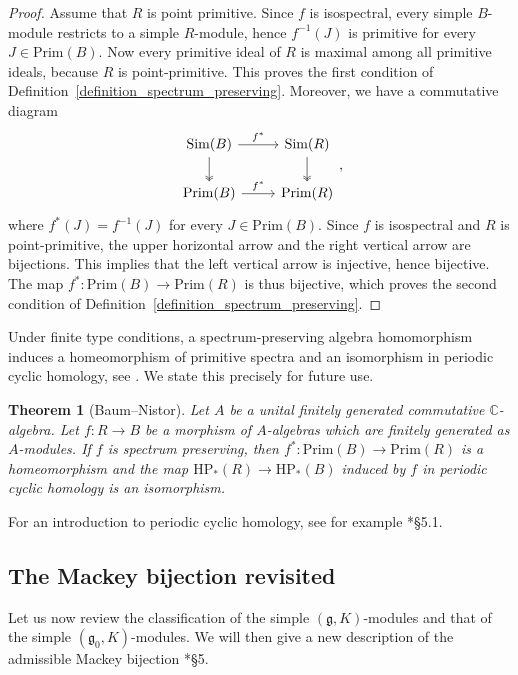 \documentclass{amsart}
\newtheorem{theorem}{Theorem}[section]
\theoremstyle{definition}
\begin{document}
\begin{proof}
    Assume that $R$ is point primitive. Since $f$ is isospectral, every simple $B$-module restricts to a simple $R$-module, hence $f^{-1}(J)$ is primitive for every $J \in \mathrm{Prim}(B)$. Now every primitive ideal of $R$ is maximal among all primitive ideals, because $R$ is point-primitive. This proves the first condition of Definition~\ref{definition_spectrum_preserving}. Moreover, we have a commutative diagram
    \[\begin{tikzcd}
        \mathrm{Sim}(B) \ar[r, "f^*"] \ar[d, twoheadrightarrow] & \mathrm{Sim}(R) \ar[d, twoheadrightarrow]\\
        \mathrm{Prim}(B) \ar[r, "f^*"] & \mathrm{Prim}(R)
    \end{tikzcd},\]
    where $f^*(J) = f^{-1}(J)$ for every $J \in \mathrm{Prim}(B)$. Since $f$ is isospectral and $R$ is point-primitive, the upper horizontal arrow and the right vertical arrow are bijections. This implies that the left vertical arrow is injective, hence bijective. The map $f^* : \mathrm{Prim}(B) \to \mathrm{Prim}(R)$ is thus bijective, which proves the second condition of Definition~\ref{definition_spectrum_preserving}.
\end{proof}

Under finite type conditions, a spectrum-preserving algebra homomorphism induces a homeomorphism of primitive spectra and an isomorphism in periodic cyclic homology, see \cite{BaumNistor}. We state this precisely for future use.

\begin{theorem}[Baum--Nistor]\label{baum_nistor_consequences}
    Let $A$ be a unital finitely generated commutative $\mathbb{C}$-algebra. Let $f : R \to B$ be a morphism of $A$-algebras which are finitely generated as $A$-modules. If $f$ is spectrum preserving, then $f^* : \mathrm{Prim}(B) \to \mathrm{Prim}(R)$ is a homeomorphism and the map $\mathrm{HP}_*(R) \to \mathrm{HP}_*(B)$ induced by $f$ in periodic cyclic homology is an isomorphism.
\end{theorem}

For an introduction to periodic cyclic homology, see for example \cite{Loday}*{§5.1}.

\subsection{The Mackey bijection revisited}\label{the_mackey_bijection_revisited}
Let us now review the classification of the simple $(\mathfrak{g},K)$-modules and that of the simple $(\mathfrak{g}_0,K)$-modules. We will then give a new description of the admissible Mackey bijection \cite{Afgoustidis1}*{§5}.
\end{document}
